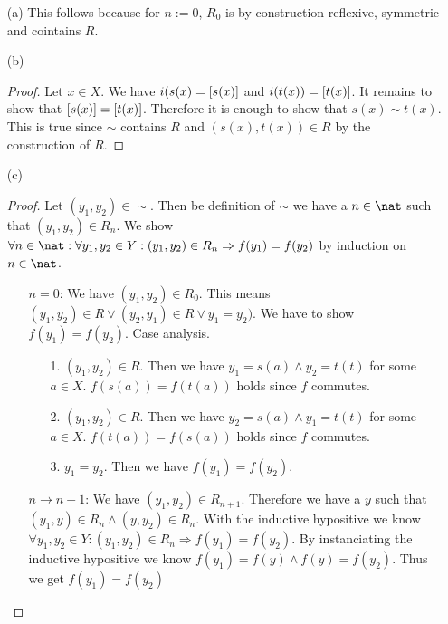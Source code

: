 \begin{answer}
  \begin{itemize}
    \item[(a)]
      This follows because for $n:=0$, $R_0$ is by construction reflexive, symmetric and cointains $R$.

    \item[(b)]
      \begin{proof}
        Let $x \in X$. We have $i(s(x)=[ s(x) ]$ and $i(t(x))=[ t(x) ]$. It remains to show that $[ s(x) ]=[ t(x) ]$. Therefore it is enough to show that $s(x) \sim t(x)$.
        This is true since $\sim$ contains $R$ and $(s(x), t(x)) \in R$ by the construction of $R$.
      \end{proof} %

    \item[(c)]
      \begin{proof}
        Let $(y_1, y_2) \in \sim$. Then be definition of $\sim$ we have a $n\in\nat$ such that $(y_1, y_2) \in R_n$.
        We show $\forall n\in\nat: \forall y_1,y_2 \in Y: (y_1, y_2) \in R_n \Rightarrow f (y_1) = f (y_2)$ by induction on $n\in\nat$.
        \begin{itemize}
          \item[$n=0$:]
            We have $(y_1, y_2) \in R_0$. This means $(y_1, y_2) \in R \lor (y_2, y_1) \in R \lor y_1 = y_2)$.
            We have to show $f(y_1) = f(y_2)$. Case analysis.
            \begin{itemize}
              \item[1.] $(y_1,y_2) \in R$. Then we have $y_1 = s(a) \land y_2 = t(t)$ for some $a \in X$. $f (s (a)) = f (t (a))$ holds since $f$ commutes.
              \item[2.] $(y_1,y_2) \in R$. Then we have $y_2 = s(a) \land y_1 = t(t)$ for some $a \in X$. $f (t (a)) = f (s (a))$ holds since $f$ commutes.
              \item[3.] $y_1=y_2$. Then we have $f(y_1) = f(y_2)$.
            \end{itemize}
          \item[$n \rightarrow n+1$:]
            We have $(y_1, y_2) \in R_{n+1}$. Therefore we have a $y$ such that $(y_1, y) \in R_n \land (y, y_2) \in R_n$.
            With the inductive hypositive we know $\forall y_1, y_2 \in Y: (y_1, y_2) \in R_n \Rightarrow f (y_1) = f (y_2)$.
            By instanciating the inductive hypositive we know $f (y_1) = f (y) \land f (y) = f (y_2)$.
            Thus we get $f (y_1) = f (y_2)$ \qedhere
        \end{itemize}
      \end{proof} %


\end{itemize}
\end{answer}
